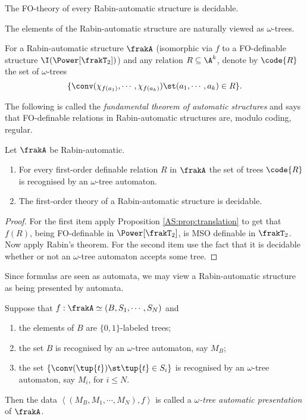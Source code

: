 \begin{corollary}
The FO-theory of every Rabin-automatic structure is decidable.
\end{corollary}

The elements of the Rabin-automatic structure are naturally viewed as $\omega$-trees. 

\begin{definition}
For a Rabin-automatic structure $\frakA$ (isomorphic via $f$ to a FO-definable structure $\I(\Power[\frakT_2])$) and any relation $R \subseteq \A^k$, denote by
$\code{R}$ the set of $\omega$-trees 
\[\{\conv(\chi_{f(a_1)},\cdots,\chi_{f(a_k)}) \st  (a_1,\cdots,a_k) \in R\}.\]
\end{definition}

The following is called the {\em fundamental theorem of automatic structures} and says that FO-definable relations in Rabin-automatic structures are, modulo coding, regular. 

\begin{theorem} \label{AS:thm:fundthm} 
Let $\frakA$ be Rabin-automatic.
\begin{enumerate}
\item For every first-order definable relation $R$ in $\frakA$ the set of trees $\code{R}$ is recognised by an $\omega$-tree automaton.
\item The first-order theory of a Rabin-automatic structure is decidable.
\end{enumerate}
\end{theorem}

\begin{proof}
For the first item apply Proposition \ref{AS:prop:translation} to get that $f(R)$, being FO-definable in $\Power[\frakT_2]$, is 
MSO definable in $\frakT_2$. Now apply Rabin's theorem.
For the second item use the fact that it is decidable whether or not an $\omega$-tree automaton accepts some tree.
\end{proof}

Since formulas are seen as automata, we may view a Rabin-automatic structure as being presented by automata.



\begin{definition} \label{AS:dfn:rap} 
Suppose that $f: \frakA \simeq  (B,S_1,\cdots,S_N)$ and
\begin{enumerate}
\item the elements of $B$ are $\{0,1\}$-labeled trees;
\item the set $B$ is recognised by an $\omega$-tree automaton, say $M_B$; 
\item the set $\{\conv(\tup{t}) \st \tup{t} \in S_i\}$ is recognised by an $\omega$-tree automaton, say $M_i$, for $i \leq N$.
\end{enumerate}
Then the data $\left<(M_B,M_1,\cdots,M_N), f \right>$ is called a {\em $\omega$-tree automatic presentation} of $\frakA$.
\end{definition}

